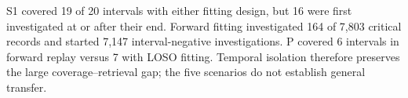 S1\key{} covered 19 of 20 intervals with either fitting design, but 16 were first investigated at or after their end. Forward fitting investigated 164 of 7,803 critical records and started 7,147 interval-negative investigations. P covered 6 intervals in forward replay versus 7 with LOSO fitting. Temporal isolation therefore preserves the large coverage--retrieval gap; the five scenarios do not establish general transfer.
